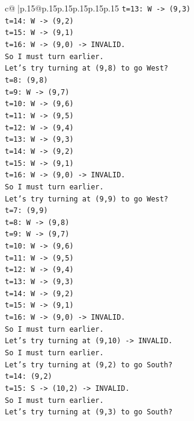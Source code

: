 \documentclass{article}
\begin{document}
{\begin{supertabular}{c@{$\;$}|p{.15\linewidth}@{}p{.15\linewidth}p{.15\linewidth}p{.15\linewidth}p{.15\linewidth}p{.15\linewidth}}
{{{\texttt{t=13: W {-}> (9,3)} \\
\texttt{t=14: W {-}> (9,2)} \\
\texttt{t=15: W {-}> (9,1)} \\
\texttt{t=16: W {-}> (9,0) {-}> INVALID.} \\
\texttt{So I must turn earlier.} \\
\texttt{Let's try turning at (9,8) to go West?} \\
\texttt{t=8: (9,8)} \\
\texttt{t=9: W {-}> (9,7)} \\
\texttt{t=10: W {-}> (9,6)} \\
\texttt{t=11: W {-}> (9,5)} \\
\texttt{t=12: W {-}> (9,4)} \\
\texttt{t=13: W {-}> (9,3)} \\
\texttt{t=14: W {-}> (9,2)} \\
\texttt{t=15: W {-}> (9,1)} \\
\texttt{t=16: W {-}> (9,0) {-}> INVALID.} \\
\texttt{So I must turn earlier.} \\
\texttt{Let's try turning at (9,9) to go West?} \\
\texttt{t=7: (9,9)} \\
\texttt{t=8: W {-}> (9,8)} \\
\texttt{t=9: W {-}> (9,7)} \\
\texttt{t=10: W {-}> (9,6)} \\
\texttt{t=11: W {-}> (9,5)} \\
\texttt{t=12: W {-}> (9,4)} \\
\texttt{t=13: W {-}> (9,3)} \\
\texttt{t=14: W {-}> (9,2)} \\
\texttt{t=15: W {-}> (9,1)} \\
\texttt{t=16: W {-}> (9,0) {-}> INVALID.} \\
\texttt{So I must turn earlier.} \\
\texttt{Let's try turning at (9,10) {-}> INVALID.} \\
\texttt{So I must turn earlier.} \\
\texttt{Let's try turning at (9,2) to go South?} \\
\texttt{t=14: (9,2)} \\
\texttt{t=15: S {-}> (10,2) {-}> INVALID.} \\
\texttt{So I must turn earlier.} \\
\texttt{Let's try turning at (9,3) to go South?} \\
}}}
\end{supertabular}}
\end{document}
